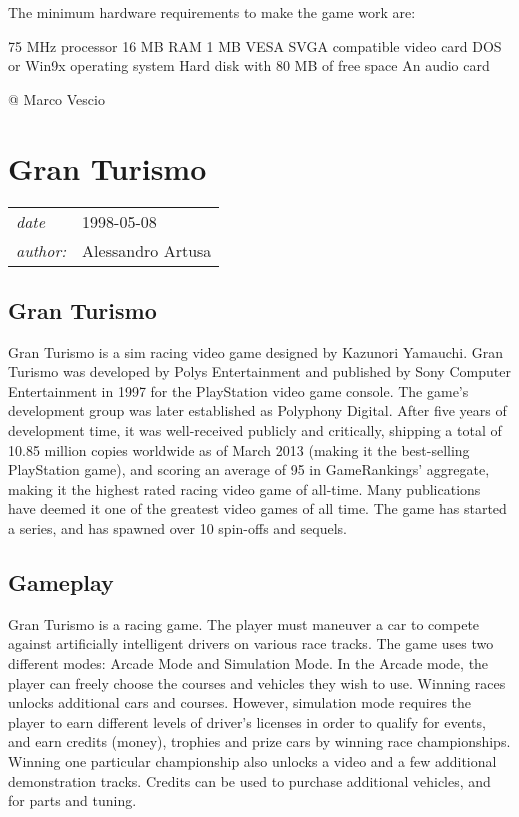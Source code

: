 \documentclass[a4paper,10pt]{book}
\newcommand{\pageHeader}[4]{
    \section{#1}
    \vspace{-0.3cm}
    \begin{table}[h!]
     \begin{tabular}{ll}
        \hline
        \textit{date} & #2 \\
        \textit{author: } & #3\\
        \hline
     \end{tabular}
    \end{table}
    \vspace{-0.3cm}
}
\begin{document}
          The minimum hardware requirements to make the game work are:
           
 75 MHz processor 
 16 MB RAM 
 1 MB VESA SVGA compatible video card 
  DOS or Win9x operating system 
 Hard disk with 80 MB of free space 
 An audio card 
 
 
 
 @ Marco Vescio 
 
 \newpage\pageHeader{Gran Turismo}{1998-05-08}{Alessandro Artusa}{Page of the first Gran Turismo made in 1997 by Polys Entertainment}
 \subsection{Gran Turismo }
 
          Gran Turismo is a sim racing video game designed by Kazunori Yamauchi. Gran Turismo was developed by Polys Entertainment and published by Sony Computer Entertainment in 1997 for the PlayStation video game console. The game's development group was later established as Polyphony Digital.  
          After five years of development time, it was well-received publicly and critically, shipping a total of 10.85 million copies worldwide as of March 2013 (making it the best-selling PlayStation game), and scoring an average of 95 in GameRankings' aggregate, making it the highest rated racing video game of all-time.  
          Many publications have deemed it one of the greatest video games of all time. The game has started a series, and has spawned over 10 spin-offs and sequels.
       
 \subsection{Gameplay }
 
          Gran Turismo is a racing game. The player must maneuver a car to compete against artificially intelligent drivers on various race tracks. The game uses two different modes: Arcade Mode and Simulation Mode.  In the Arcade mode, the player can freely choose the courses and vehicles they wish to use.  Winning races unlocks additional cars and courses.
          However, simulation mode requires the player to earn different levels of driver's licenses in order to qualify for events, and earn credits (money), trophies and prize cars by winning race championships. Winning one particular championship also unlocks a video and a few additional demonstration tracks. Credits can be used to purchase additional vehicles, and for parts and tuning.
         
\end{document}
